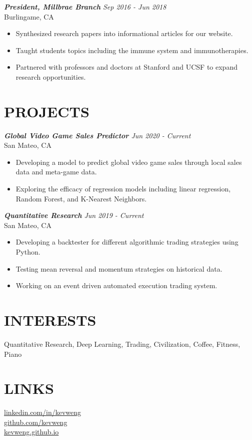 \documentclass[margin, 10pt]{res} %
\begin{document}
\begin{resume}
{\sl {\bf President, Millbrae Branch} \hfill Sep 2016 - Jun 2018} \\
Burlingame, CA
\begin{itemize}  \itemsep -1pt
\item Synthesized research papers into informational articles for our website. 
\item Taught students topics including the immune system and immunotherapies.
\item Partnered with professors and doctors at Stanford and UCSF to expand research opportunities.
\end{itemize} 




\section{\large PROJECTS} 
{\sl {\bf Global Video Game Sales Predictor} \hfill Jun 2020 - Current} \\
San Mateo, CA
\begin{itemize}  \itemsep -1pt
\item Developing a model to predict global video game sales through local sales data and meta-game data. 
\item Exploring the efficacy of regression models including linear regression, Random Forest, and K-Nearest Neighbors.
\end{itemize} 

{\sl {\bf Quantitative Research} \hfill Jun 2019 - Current} \\
San Mateo, CA
\begin{itemize}  \itemsep -1pt
\item Developing a backtester for different algorithmic trading strategies using Python.
\item Testing mean reversal and momentum strategies on historical data.
\item Working on an event driven automated execution trading system. 
\end{itemize} 

\section{\large INTERESTS}
Quantitative Research, Deep Learning, Trading, Civilization, Coffee, Fitness, Piano

\section{\large LINKS}

\href{https://www.linkedin.com/in/kevweng/}{linkedin.com/in/kevweng}\\
\href{https://github.com/kevweng}{github.com/kevweng}\\
\href{https://kevweng.github.io}{kevweng.github.io}
\end{resume}
\end{document}
